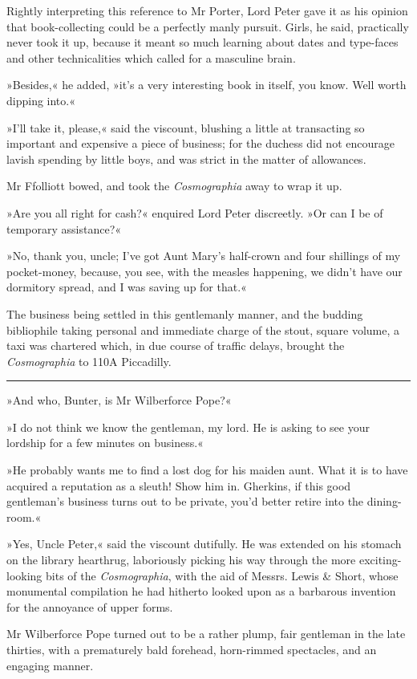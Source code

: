 Rightly interpreting this reference to Mr Porter, Lord Peter gave it as his opinion that book-collecting could be a perfectly manly pursuit. Girls, he said, practically never took it up, because it meant so much learning about dates and type-faces and other technicalities which called for a masculine brain.

»Besides,« he added, »it's a very interesting book in itself, you know. Well worth dipping into.«

»I'll take it, please,« said the viscount, blushing a little at transacting so important and expensive a piece of business; for the duchess did not encourage lavish spending by little boys, and was strict in the matter of allowances.

Mr Ffolliott bowed, and took the \textit{Cosmographia} away to wrap it up.

»Are you all right for cash?« enquired Lord Peter discreetly. »Or can I be of temporary assistance?«

»No, thank you, uncle; I've got Aunt Mary's half-crown and four shillings of my pocket-money, because, you see, with the measles happening, we didn't have our dormitory spread, and I was saving up for that.«

The business being settled in this gentlemanly manner, and the budding bibliophile taking personal and immediate charge of the stout, square volume, a taxi was chartered which, in due course of traffic delays, brought the \textit{Cosmographia} to 110A Piccadilly.

\noindent\hfil\rule{0.5\textwidth}{.4pt}\hfil 
\pagebreak[2]

»And who, Bunter, is Mr Wilberforce Pope?«

»I do not think we know the gentleman, my lord. He is asking to see your lordship for a few minutes on business.«

»He probably wants me to find a lost dog for his maiden aunt. What it is to have acquired a reputation as a sleuth! Show him in. Gherkins, if this good gentleman's business turns out to be private, you'd better retire into the dining-room.«

»Yes, Uncle Peter,« said the viscount dutifully. He was extended on his stomach on the library hearthrug, laboriously picking his way through the more exciting-looking bits of the \textit{Cosmographia}, with the aid of Messrs. Lewis \& Short, whose monumental compilation he had hitherto looked upon as a barbarous invention for the annoyance of upper forms.

Mr Wilberforce Pope turned out to be a rather plump, fair gentleman in the late thirties, with a prematurely bald forehead, horn-rimmed spectacles, and an engaging manner.

